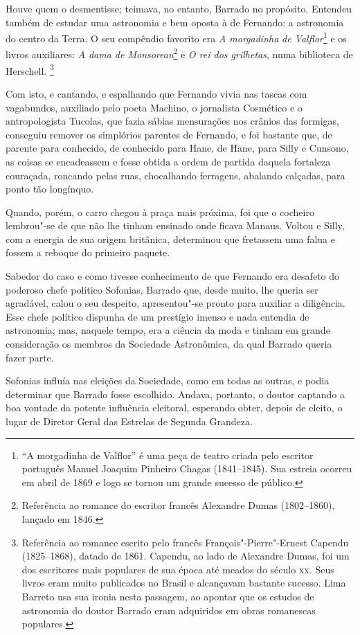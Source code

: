 Houve quem o desmentisse; teimava, no entanto, Barrado no propósito.
Entendeu também de estudar uma astronomia e bem oposta à de Fernando: a
astronomia do centro da Terra. O seu compêndio favorito era \emph{A
morgadinha} \emph{de Valflor}\footnote{``A morgadinha de Valflor'' é uma
  peça de teatro criada pelo escritor português Manuel Joaquim Pinheiro
  Chagas (1841--1845). Sua estreia ocorreu em abril de 1869 e logo se
  tornou um grande sucesso de público.} e os livros auxiliares: \emph{A
dama de Monsoreau}\footnote{Referência ao romance do escritor francês
  Alexandre Dumas (1802--1860), lançado em 1846.} e \emph{O rei dos
grilhetas}, numa biblioteca de Herschell. \footnote{Referência ao
  romance escrito pelo francês François"-Pierre"-Ernest Capendu (1825--1868), datado de 1861. Capendu, ao lado de Alexandre Dumas, foi um dos
  escritores mais populares de sua época até meados do século \textsc{xx}. Seus
  livros eram muito publicados no Brasil e alcançavam bastante sucesso.
  Lima Barreto usa sua ironia nesta passagem, ao apontar que os estudos
  de astronomia do doutor Barrado eram adquiridos em obras romanescas
  populares.}

Com isto, e cantando, e espalhando que Fernando vivia nas tascas com
vagabundos, auxiliado pelo poeta Machino, o jornalista Cosmético e o
antropologista Tucolas, que fazia sábias mensurações nos crânios das
formigas, conseguiu remover os simplórios parentes de Fernando, e foi
bastante que, de parente para conhecido, de conhecido para Hane, de
Hane, para Silly e Cunsono, as coisas se encadeassem e fosse obtida a
ordem de partida daquela fortaleza couraçada, roncando pelas ruas,
chocalhando ferragens, abalando calçadas, para ponto tão longínquo.

Quando, porém, o carro chegou à praça mais próxima, foi que o cocheiro
lembrou"-se de que não lhe tinham ensinado onde ficava Manaus. Voltou e
Silly, com a energia de sua origem britânica, determinou que fretassem
uma falua e fossem a reboque do primeiro paquete.

Sabedor do caso e como tivesse conhecimento de que Fernando era desafeto
do poderoso chefe político Sofonias, Barrado que, desde muito, lhe
queria ser agradável, calou o seu despeito, apresentou"-se pronto para
auxiliar a diligência. Esse chefe político dispunha de um prestígio
imenso e nada entendia de astronomia; mas, naquele tempo, era a ciência
da moda e tinham em grande consideração os membros da Sociedade
Astronômica, da qual Barrado queria fazer parte.

Sofonias influía nas eleições da Sociedade, como em todas as outras, e
podia determinar que Barrado fosse escolhido. Andava, portanto, o doutor
captando a boa vontade da potente influência eleitoral, esperando obter,
depois de eleito, o lugar de Diretor Geral das Estrelas de Segunda
Grandeza.

